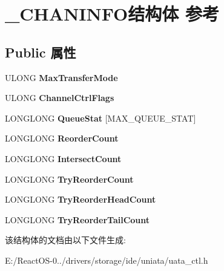 \hypertarget{struct___c_h_a_n_i_n_f_o}{}\section{\+\_\+\+C\+H\+A\+N\+I\+N\+F\+O结构体 参考}
\label{struct___c_h_a_n_i_n_f_o}
\subsection*{Public 属性}
\begin{DoxyCompactItemize}
\item 
\mbox{\label{struct___c_h_a_n_i_n_f_o_a30589623347ebd13ba576a896feb7649}} 
U\+L\+O\+NG {\bfseries Max\+Transfer\+Mode}
\item 
\mbox{\label{struct___c_h_a_n_i_n_f_o_afff1c01e21fd218d8e4dba5f1a073bb9}} 
U\+L\+O\+NG {\bfseries Channel\+Ctrl\+Flags}
\item 
\mbox{\label{struct___c_h_a_n_i_n_f_o_a4518fc40342d7eae514da9640e1767b8}} 
L\+O\+N\+G\+L\+O\+NG {\bfseries Queue\+Stat} \mbox{[}M\+A\+X\+\_\+\+Q\+U\+E\+U\+E\+\_\+\+S\+T\+AT\mbox{]}
\item 
\mbox{\label{struct___c_h_a_n_i_n_f_o_a44780fd197bb58392138332c53764f0b}} 
L\+O\+N\+G\+L\+O\+NG {\bfseries Reorder\+Count}
\item 
\mbox{\label{struct___c_h_a_n_i_n_f_o_a7e4be044262c03809e26e23cfea569df}} 
L\+O\+N\+G\+L\+O\+NG {\bfseries Intersect\+Count}
\item 
\mbox{\label{struct___c_h_a_n_i_n_f_o_ad09cfeceef75840a24ee932a5c92b934}} 
L\+O\+N\+G\+L\+O\+NG {\bfseries Try\+Reorder\+Count}
\item 
\mbox{\label{struct___c_h_a_n_i_n_f_o_a756d71ddb475da71ba71f2fcc6768fb5}} 
L\+O\+N\+G\+L\+O\+NG {\bfseries Try\+Reorder\+Head\+Count}
\item 
\mbox{\label{struct___c_h_a_n_i_n_f_o_ab54aeb47abbaa6442cd9c00408d382cd}} 
L\+O\+N\+G\+L\+O\+NG {\bfseries Try\+Reorder\+Tail\+Count}
\end{DoxyCompactItemize}


该结构体的文档由以下文件生成\+:\begin{DoxyCompactItemize}
\item 
E\+:/\+React\+O\+S-\/0../drivers/storage/ide/uniata/uata\+\_\+ctl.\+h\end{DoxyCompactItemize}
